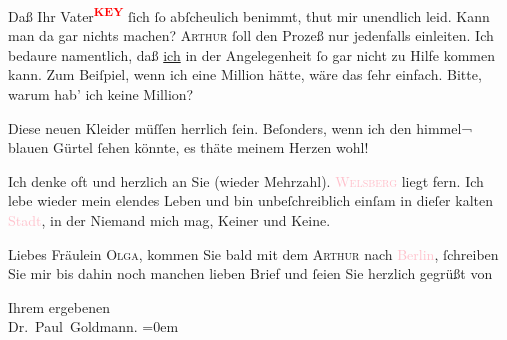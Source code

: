 \pstart
           {\pb}Daß Ihr Vater\textcolor{red}{\textsuperscript{\textbf{KEY}}} ſich ſo abſcheulich benimmt, thut mir unendlich leid. Kann man da gar
               nichts machen? \textsc{Arthur} ſoll den Prozeß nur jedenfalls
               einleiten. Ich bedaure namentlich, daß \uline{ich} in der
               Angelegenheit ſo gar nicht zu Hilfe kommen kann. Zum Beiſpiel, wenn ich eine Million
               hätte, wäre das ſehr einfach. Bitte, warum hab’ ich keine Million?\pend
           
\pstart
           Diese neuen Kleider müſſen herrlich ſein. Beſonders, wenn ich den himmel¬ blauen
               Gürtel ſehen könnte, es thäte meinem Herzen wohl!\pend
           
\pstart
           Ich denke oft und herzlich an Sie (wieder Mehrzahl). \textcolor{pink}{\textsc{Welsberg}}{}\ledrightnote{\textcolor{pink}{Welsberg-Taisten}} liegt fern. Ich lebe wieder mein elendes
               Leben und bin unbeſchreiblich einſam in dieſer kalten \textcolor{pink}{Stadt}{}\ledrightnote{{$\rightarrow$}\textcolor{pink}{Berlin}}, in der Niemand mich mag, Keiner und Keine.\pend
           
\pstart
           {\pb}Liebes Fräulein \textsc{Olga},
               kommen Sie bald mit dem \textsc{Arthur} nach \textcolor{pink}{Berlin}{}\ledrightnote{\textcolor{pink}{Berlin}}, ſchreiben Sie mir bis dahin noch manchen lieben Brief
               und ſeien Sie herzlich gegrüßt von\pend
           
\pstart
            Ihrem ergebenen{\\[\baselineskip]}\spacefill\mbox{Dr. Paul Goldmann.}\pend
           \leftskip=0em{}\endnumbering{}
\begin{anhang}
\end{anhang}
      
